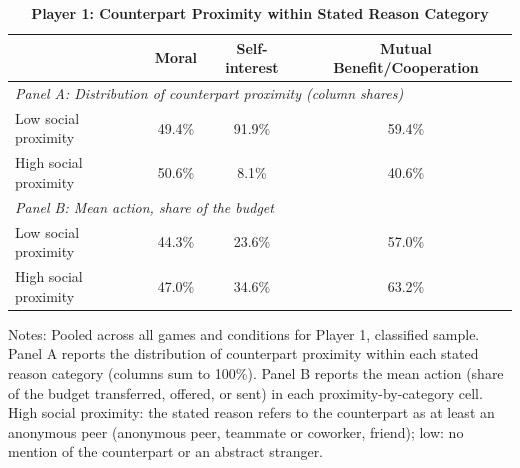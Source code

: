 \begin{table}[!htbp]
\centering
\caption{\textbf{Player 1: Counterpart Proximity within Stated Reason Category}}
\label{tab:player1_sp_by_category}
\begin{tabular}{lccc}
\toprule
& Moral & Self-interest & Mutual Benefit/Cooperation \\
\midrule
\multicolumn{4}{l}{\emph{Panel A: Distribution of counterpart proximity (column shares)}} \\ %
Low social proximity & 49.4\% & 91.9\% & 59.4\% \\
High social proximity & 50.6\% & 8.1\% & 40.6\% \\
\midrule
\multicolumn{4}{l}{\emph{Panel B: Mean action, share of the budget}} \\ %
Low social proximity & 44.3\% & 23.6\% & 57.0\% \\
High social proximity & 47.0\% & 34.6\% & 63.2\% \\
\bottomrule
\end{tabular}
\begin{flushleft}
\footnotesize Notes: Pooled across all games and conditions for Player 1, classified sample. Panel A reports the distribution of counterpart proximity within each stated reason category (columns sum to 100\%). Panel B reports the mean action (share of the budget transferred, offered, or sent) in each proximity-by-category cell. High social proximity: the stated reason refers to the counterpart as at least an anonymous peer (anonymous peer, teammate or coworker, friend); low: no mention of the counterpart or an abstract stranger.
\end{flushleft}
\end{table}
